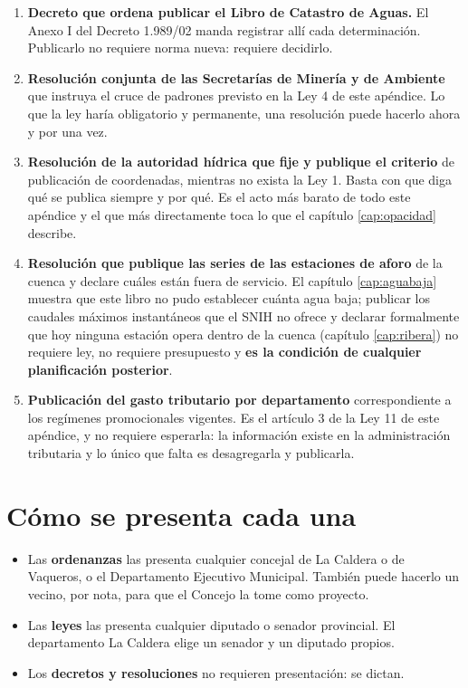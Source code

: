 \begin{enumerate}[leftmargin=*,itemsep=0.5em]
\item \textbf{Decreto que ordena publicar el Libro de Catastro de Aguas.} El Anexo I del
Decreto 1.989/02 manda registrar allí cada determinación. Publicarlo no requiere norma nueva:
requiere decidirlo.

\item \textbf{Resolución conjunta de las Secretarías de Minería y de Ambiente} que instruya el
cruce de padrones previsto en la Ley 4 de este apéndice. Lo que la ley haría obligatorio y
permanente, una resolución puede hacerlo ahora y por una vez.

\item \textbf{Resolución de la autoridad hídrica que fije y publique el criterio} de
publicación de coordenadas, mientras no exista la Ley 1. Basta con que diga qué se publica
siempre y por qué. Es el acto más barato de todo este apéndice y el que más directamente toca
lo que el capítulo \ref{cap:opacidad} describe.

\item \textbf{Resolución que publique las series de las estaciones de aforo} de la cuenca y
declare cuáles están fuera de servicio. El capítulo \ref{cap:aguabaja} muestra que este libro
no pudo establecer cuánta agua baja; publicar los caudales máximos instantáneos que el SNIH no ofrece y declarar formalmente que hoy ninguna estación opera dentro de la cuenca (capítulo \ref{cap:ribera}) no requiere ley, no requiere
presupuesto y \textbf{es la condición de cualquier planificación posterior}.

\item \textbf{Publicación del gasto tributario por departamento} correspondiente a los
regímenes promocionales vigentes. Es el artículo 3 de la Ley 11 de este apéndice, y no
requiere esperarla: la información existe en la administración tributaria y lo único que falta
es desagregarla y publicarla.
\end{enumerate}

\section{Cómo se presenta cada una}

\begin{itemize}[leftmargin=*,itemsep=0.35em]
\item Las \textbf{ordenanzas} las presenta cualquier concejal de La Caldera o de Vaqueros, o
el Departamento Ejecutivo Municipal. También puede hacerlo un vecino, por nota, para que el
Concejo la tome como proyecto.
\item Las \textbf{leyes} las presenta cualquier diputado o senador provincial. El departamento
La Caldera elige un senador y un diputado propios.
\item Los \textbf{decretos y resoluciones} no requieren presentación: se dictan.
\end{itemize}

